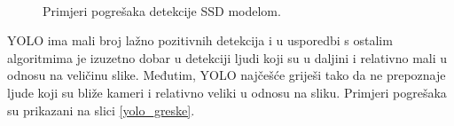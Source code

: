 \begin{figure}[H]
 \
 \
\caption{Primjeri pogrešaka detekcije SSD modelom.}
\label{ssd_greske}
\end{figure}

YOLO ima mali broj lažno pozitivnih detekcija i u usporedbi s ostalim algoritmima je izuzetno dobar u detekciji ljudi koji su u daljini i relativno mali u odnosu na veličinu slike. Međutim, YOLO najčešće griješi tako da ne prepoznaje ljude koji su bliže kameri i relativno veliki u odnosu na sliku. Primjeri pogrešaka su prikazani na slici \ref{yolo_greske}.

